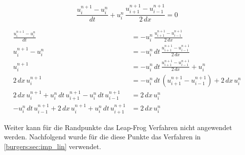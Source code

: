 \begin{equation}
    \frac{u_{i}^{n+1}-u_{i}^{n}}{dt} + u_{i}^{n} \, \frac{u_{i+1}^{n+1} - u_{i-1}^{n+1}}{2 \, dx} = 0
\end{equation}

\begin{subequations}
  \begin{align}
  \frac{u_{i}^{n+1}-u_{i}^{n}}{dt} &= -u_{i}^{n} \, \frac{u_{i+1}^{n+1} - u_{i-1}^{n+1}}{2 \, dx} \\
    u_{i}^{n+1}-u_{i}^{n} &= -u_{i}^{n} \, dt \, \frac{u_{i+1}^{n+1} - u_{i-1}^{n+1}}{2 \, dx}\\
    u_{i}^{n+1} &= -u_{i}^{n} \, dt \, \frac{u_{i+1}^{n+1} - u_{i-1}^{n+1}}{2 \, dx} + u_{i}^{n}\\
    2 \, dx \,  u_{i}^{n+1} &= -u_{i}^{n} \, dt \, \left(u_{i+1}^{n+1} - u_{i-1}^{n+1} \right) + 2 \, dx \, u_{i}^{n}\\
    2 \, dx \,  u_{i}^{n+1} + u_{i}^{n} \, dt \, u_{i+1}^{n+1} -u_{i}^{n} \, dt \, u_{i-1}^{n+1} & =  2 \, dx \, u_{i}^{n}\\
   -u_{i}^{n} \, dt \, u_{i-1}^{n+1} +  2 \, dx \,  u_{i}^{n+1} + u_{i}^{n} \, dt \, u_{i+1}^{n+1} &=  2 \, dx \, u_{i}^{n}
  \end{align}
\end{subequations}



Weiter kann f\"ur die Randpunkte das Leap-Frog Verfahren nicht angewendet werden.
Nachfolgend wurde f\"ur die diese Punkte das Verfahren in \ref{burgers:sec:imp_lin} verwendet.

